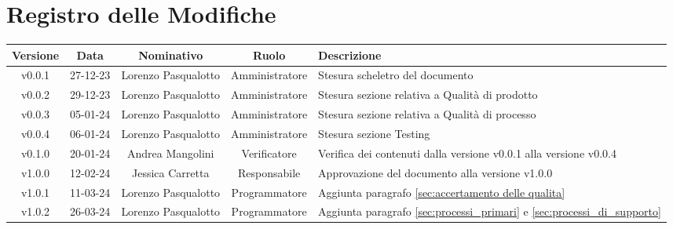\section*{\Large Registro delle Modifiche}
    \begin{table}[h]
        \centering
        \renewcommand\tabularxcolumn[1]{m{#1}} %
        \renewcommand{\arraystretch}{1.5}
        \begin{tabularx}{0.98\textwidth}
            {c|c|c|c|>{\centering\arraybackslash}X}
            \rowcolor{black}
            \textbf{\color{white} Versione} & \textbf{\color{white} Data} & \textbf{\color{white} Nominativo} & \textbf{\color{white} Ruolo} & \textbf{\color{white} Descrizione} \\ 
            \hline

            v0.0.1 & 27-12-23 & Lorenzo Pasqualotto & Amministratore & Stesura scheletro del documento \\

            v0.0.2 & 29-12-23 & Lorenzo Pasqualotto & Amministratore & Stesura sezione relativa a Qualità di prodotto\\

            v0.0.3 & 05-01-24 & Lorenzo Pasqualotto & Amministratore & Stesura sezione relativa a Qualità di processo\\

            v0.0.4 & 06-01-24 & Lorenzo Pasqualotto & Amministratore & Stesura sezione Testing\\

            v0.1.0 & 20-01-24 & Andrea Mangolini & Verificatore & Verifica dei contenuti dalla versione v0.0.1 alla versione v0.0.4\\

            v1.0.0 & 12-02-24 & Jessica Carretta & Responsabile & Approvazione del documento alla versione v1.0.0\\

            v1.0.1 & 11-03-24 & Lorenzo Pasqualotto & Programmatore & Aggiunta paragrafo \ref{sec:accertamento delle qualita}\\

            v1.0.2 & 26-03-24 & Lorenzo Pasqualotto & Programmatore & Aggiunta paragrafo \ref{sec:processi_primari} e \ref{sec:processi_di_supporto}\\


\end{tabularx}
\end{table}
